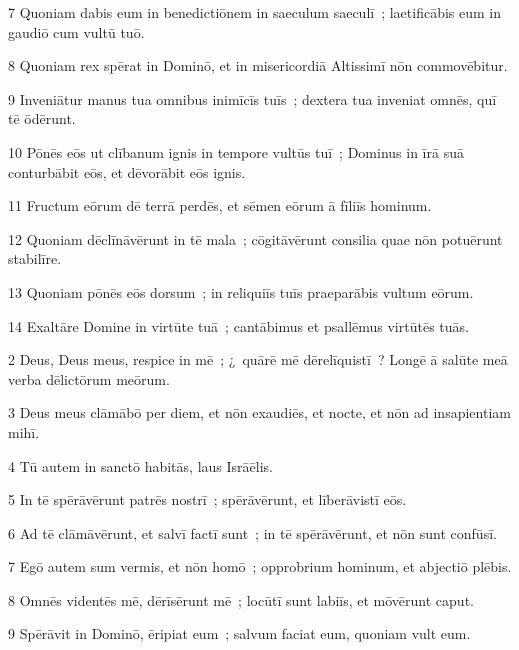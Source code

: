 \psalmVerse
  {\phantom{00}7}
  {Quoniam dabis eum in benedictiōnem in saeculum saeculī~; laetificābis eum in gaudiō cum vultū tuō.}


\psalmVerse
  {\phantom{00}8}
  {Quoniam rex spērat in Dominō, et in misericordiā Altissimī nōn commovēbitur.}


\psalmVerse
  {\phantom{00}9}
  {Inveniātur manus tua omnibus inimīcīs tuīs~; dextera tua inveniat omnēs, quī tē ōdērunt.}


\psalmVerse
  {\phantom{0}10}
  {Pōnēs eōs ut clībanum ignis in tempore vultūs tuī~; Dominus in īrā suā conturbābit eōs, et dēvorābit eōs ignis.}


\psalmVerse
  {\phantom{0}11}
  {Fructum eōrum dē terrā perdēs, et sēmen eōrum ā fīliīs hominum.}


\psalmVerse
  {\phantom{0}12}
  {Quoniam dēclīnāvērunt in tē mala~; cōgitāvērunt consilia quae nōn potuērunt stabilīre.}


\psalmVerse
  {\phantom{0}13}
  {Quoniam pōnēs eōs dorsum~; in reliquiīs tuīs praeparābis vultum eōrum.}


\psalmVerse
  {\phantom{0}14}
  {Exaltāre Domine in virtūte tuā~; cantābimus et psallēmus virtūtēs tuās.}




\psalmVerse
  {\phantom{00}2}
  {Deus, Deus meus, respice in mē~; ¿~quārē mē dērelīquistī~? Longē ā salūte meā verba dēlictōrum meōrum.}


\psalmVerse
  {\phantom{00}3}
  {Deus meus clāmābō per diem, et nōn exaudiēs, et nocte, et nōn ad insapientiam mihī.}


\psalmVerse
  {\phantom{00}4}
  {Tū autem in sanctō habitās, laus Isrāēlis.}


\psalmVerse
  {\phantom{00}5}
  {In tē spērāvērunt patrēs nostrī~; spērāvērunt, et līberāvistī eōs.}


\psalmVerse
  {\phantom{00}6}
  {Ad tē clāmāvērunt, et salvī factī sunt~; in tē spērāvērunt, et nōn sunt confūsī.}


\psalmVerse
  {\phantom{00}7}
  {Egō autem sum vermis, et nōn homō~; opprobrium hominum, et abjectiō plēbis.}


\psalmVerse
  {\phantom{00}8}
  {Omnēs videntēs mē, dērīsērunt mē~; locūtī sunt labiīs, et mōvērunt caput.}


\psalmVerse
  {\phantom{00}9}
  {Spērāvit in Dominō, ēripiat eum~; salvum faciat eum, quoniam vult eum.}


